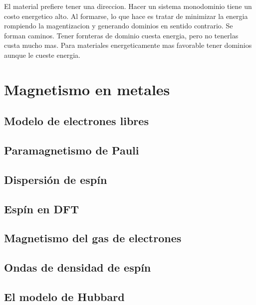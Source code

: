 \documentclass[11pt,fleqn]{book}
\begin{document}
El material prefiere tener una direccion. Hacer un sistema monodominio tiene un costo energetico alto. Al formarse, lo que hace es tratar de minimizar la energia rompiendo la magentizacion y generando dominios en sentido contrario. Se forman caminos. Tener fornteras de dominio cuesta energia, pero no tenerlas custa mucho mas. Para materiales energeticamente mas favorable tener dominios aunque le cueste energia. 





\chapter{Magnetismo en metales}



    \section{Modelo de electrones libres}
    \section{Paramagnetismo de Pauli}
    \section{Dispersión de espín}
    \section{Espín en DFT}
    \section{Magnetismo del gas de electrones}
    \section{Ondas de densidad de espín}
    \section{El modelo de Hubbard}
    
    
    
    
    
\end{document}
